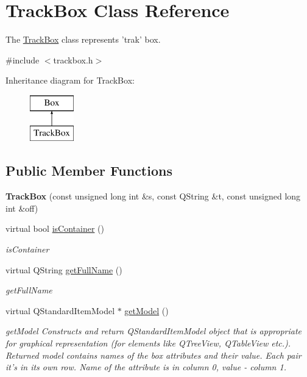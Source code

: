 \hypertarget{class_track_box}{\section{Track\-Box Class Reference}
\label{class_track_box}
}


The \hyperlink{class_track_box}{Track\-Box} class represents 'trak' box.  




{\ttfamily \#include $<$trackbox.\-h$>$}

Inheritance diagram for Track\-Box\-:\begin{figure}[H]
\begin{center}
\leavevmode
\includegraphics[height=2.000000cm]{class_track_box}
\end{center}
\end{figure}
\subsection*{Public Member Functions}
\begin{DoxyCompactItemize}
\item 
\hypertarget{class_track_box_a201d00a49a1f88dc59d6ff687354cde9}{{\bfseries Track\-Box} (const unsigned long int \&s, const Q\-String \&t, const unsigned long int \&off)}\label{class_track_box_a201d00a49a1f88dc59d6ff687354cde9}

\item 
virtual bool \hyperlink{class_track_box_a9e3d52a20872169fc6f29c09f1e2ce95}{is\-Container} ()
\begin{DoxyCompactList}\small\item\em is\-Container \end{DoxyCompactList}\item 
virtual Q\-String \hyperlink{class_track_box_a2d45d42edb82a5445d54e184894aa730}{get\-Full\-Name} ()
\begin{DoxyCompactList}\small\item\em get\-Full\-Name \end{DoxyCompactList}\item 
virtual Q\-Standard\-Item\-Model $\ast$ \hyperlink{class_track_box_ab1412b2b26163ad23191427e6e934b90}{get\-Model} ()
\begin{DoxyCompactList}\small\item\em get\-Model Constructs and return Q\-Standard\-Item\-Model object that is appropriate for graphical representation (for elements like Q\-Tree\-View, Q\-Table\-View etc.). Returned model contains names of the box attributes and their value. Each pair it's in its own row. Name of the attribute is in column 0, value -\/ column 1. \end{DoxyCompactList}\end{DoxyCompactItemize}
